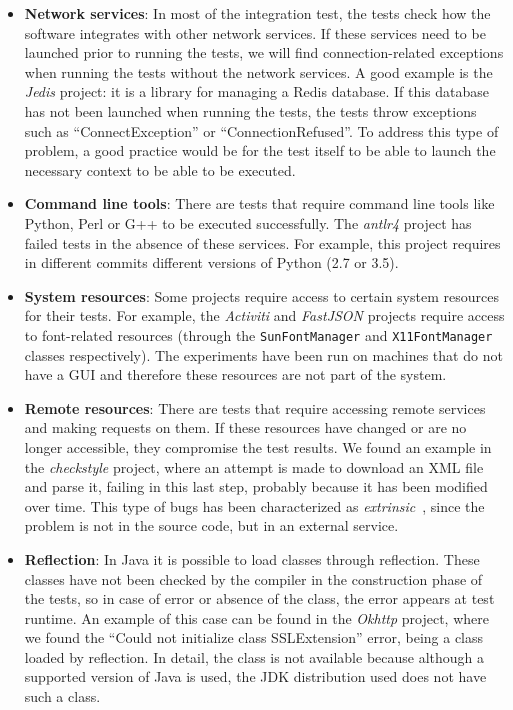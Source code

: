 \begin{itemize}
    \item \textbf{Network services}: 
    In most of the integration test, the tests check how the software integrates with other network services. If these services need to be launched prior to running the tests, we will find connection-related exceptions when running the tests without the network services.
    A good example is the \textit{Jedis} project: it is a library for managing a Redis database. 
    If this database has not been launched when running the tests, the tests throw exceptions such as ``ConnectException'' or ``ConnectionRefused''.
    To address this type of problem, a good practice would be for the test itself to be able to launch the necessary context to be able to be executed.
    \item \textbf{Command line tools}: 
    There are tests that require command line tools like Python, Perl or G++ to be executed successfully. 
    The \textit{antlr4} project has failed tests in the absence of these services. 
    For example, this project requires in different commits different versions of Python (2.7 or 3.5).
    \item \textbf{System resources}: 
    Some projects require access to certain system resources for their tests. 
    For example, the \textit{Activiti} and \textit{FastJSON} projects require access to font-related resources (through the \texttt{SunFontManager} and \texttt{X11FontManager} classes respectively). 
    The experiments have been run on machines that do not have a GUI and therefore these resources are not part of the system.
    \item \textbf{Remote resources}: 
    There are tests that require accessing remote services and making requests on them. 
    If these resources have changed or are no longer accessible, they compromise the test results. 
    We found an example in the \textit{checkstyle} project, where an attempt is made to download an XML file and parse it, failing in this last step, probably because it has been modified over time.
    This type of bugs has been characterized as \textit{extrinsic}~\cite{rodriguez2020bugs,rodriguezperez2020watch,rodriguez2018if}, since the problem is not in the source code, but in an external service.
    \item \textbf{Reflection}: 
    In Java it is possible to load classes through reflection. 
    These classes have not been checked by the compiler in the construction phase of the tests, so in case of error or absence of the class, the error appears at test runtime. 
    An example of this case can be found in the \textit{Okhttp} project, where we found the ``Could not initialize class SSLExtension'' error, being a class loaded by reflection.
    In detail, the class is not available because although a supported version of Java is used, the JDK distribution used does not have such a class.
\end{itemize}

